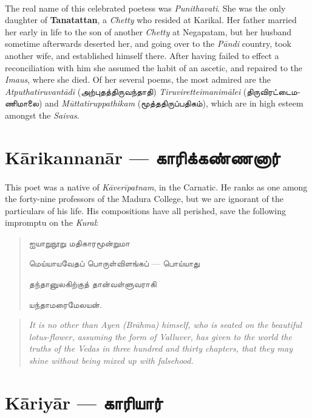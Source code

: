\documentclass{article}
\newcommand{\TamilText}[1]{\texttamil{#1}}
\newcommand{\TamilBold}[1]{\texttamil{\textbf{#1}}}
\newcommand{\tam}[1]{\TamilText{#1}}
\newcommand{\tambold}[1]{\TamilBold{#1}}
\begin{document}
\paragraph{}
The real name of this celebrated poetess was \emph{Punithavati}. She was the only daughter of \textbf{Tanatattan}, a \emph{Chetty} who resided at Karikal. Her father married her early in life to the son of another \emph{Chetty} at Negapatam, but her husband sometime afterwards deserted her, and going over to the \emph{P\={a}ndi} country, took another wife, and established himself there. After having failed to effect a reconciliation with him she assumed the habit of an ascetic, and repaired to the \emph{Imaus}, where she died. Of her several poems, the most admired are the \emph{Atputhatiruvant\={a}di} (\tam{அற்புதத்திருவந்தாதி}) \emph{Tiruviretteimanim\={a}lei} (\tam{திருவிரட்டைமணிமாலை}) and \emph{M\={u}ttatiruppathikam} (\tam{மூத்ததிருப்பதிகம்}), which are in high esteem amongst the \emph{Saivas}.

\section{K\={a}rikannan\={a}r --- \tambold{காரிக்கண்ணனார்}}
\paragraph{}
This poet was a native of \emph{K\={a}ver\={i}patnam}, in the Carnatic. He ranks as one among the forty-nine professors of the Madura College, but we are ignorant of the particulars of his life. His compositions have all perished, save the following impromptu on the \emph{Kural}:
\begin{quotation}\small
\tam{ஐயாறுநூறு மதிகாரமூன்றுமா}

\tam{மெய்யாயவேதப்‌ பொருள்விளங்கப்‌} --- \tam{பொய்யாது}

\tam{தந்தானுலகிற்குத்‌ தான்வள்ளுவராகி}

\tam{யந்தாமரைமேலயன்‌}.
\end{quotation}
\begin{quotation}\small
\emph{It is no other than Ayen (Br\={a}hma) himself, who is seated on the beautiful lotus-flower, assuming the form of Valluver, has given to the world the truths of the Vedas in three hundred and thirty chapters, that they may shine without being mixed up with falsehood.}
\end{quotation}

\section{K\={a}riy\={a}r --- \tambold{காரியார்}}
\end{document}
